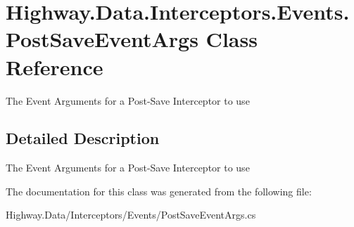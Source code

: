 \hypertarget{class_highway_1_1_data_1_1_interceptors_1_1_events_1_1_post_save_event_args}{\section{Highway.\-Data.\-Interceptors.\-Events.\-Post\-Save\-Event\-Args Class Reference}
\label{class_highway_1_1_data_1_1_interceptors_1_1_events_1_1_post_save_event_args}
}


The Event Arguments for a Post-\/\-Save Interceptor to use  




\subsection{Detailed Description}
The Event Arguments for a Post-\/\-Save Interceptor to use 



The documentation for this class was generated from the following file\-:\begin{DoxyCompactItemize}
\item 
Highway.\-Data/\-Interceptors/\-Events/Post\-Save\-Event\-Args.\-cs\end{DoxyCompactItemize}
